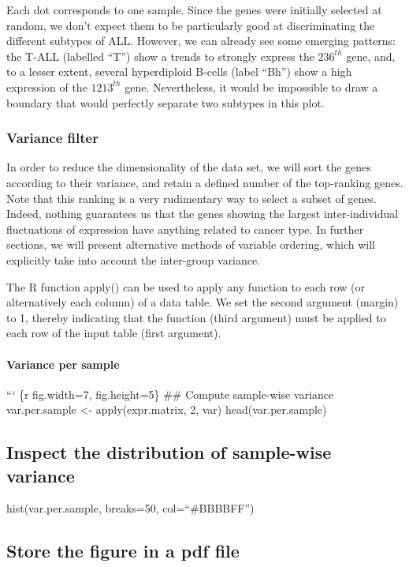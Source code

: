 Each dot corresponds to one sample. Since the genes were initially
selected at random, we don't expect them to be particularly good at
discriminating the different subtypes of ALL. However, we can already
see some emerging patterns: the T-ALL (labelled ``T'') show a trends to
strongly express the $236^{th}$ gene, and, to a lesser extent, several
hyperdiploid B-cells (label ``Bh'') show a high expression of the
$1213^{th}$ gene. Nevertheless, it would be impossible to draw a
boundary that would perfectly separate two subtypes in this plot.

\subsubsection{Variance filter}\label{variance-filter}

In order to reduce the dimensionality of the data set, we will sort the
genes according to their variance, and retain a defined number of the
top-ranking genes. Note that this ranking is a very rudimentary way to
select a subset of genes. Indeed, nothing guarantees us that the genes
showing the largest inter-individual fluctuations of expression have
anything related to cancer type. In further sections, we will present
alternative methods of variable ordering, which will explicitly take
into account the inter-group variance.

The {R} function apply() can be used to apply any function to each row
(or alternatively each column) of a data table. We set the second
argument (margin) to 1, thereby indicating that the function (third
argument) must be applied to each row of the input table (first
argument).

\paragraph{Variance per sample}\label{variance-per-sample}

``` \{r fig.width=7, fig.height=5\} \#\# Compute sample-wise variance
var.per.sample \textless{}- apply(expr.matrix, 2, var)
head(var.per.sample)

\subsection{Inspect the distribution of sample-wise
variance}\label{inspect-the-distribution-of-sample-wise-variance}

hist(var.per.sample, breaks=50, col=``\#BBBBFF'')

\subsection{Store the figure in a pdf
file}\label{store-the-figure-in-a-pdf-file}

